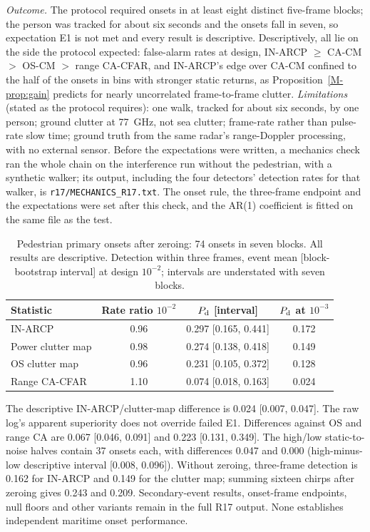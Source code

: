 \documentclass[10pt]{article}
\begin{document}
\emph{Outcome.} The protocol required onsets in at least eight distinct five-frame blocks; the person was tracked for about six seconds and the onsets fall in seven, so expectation E1 is not met and every result is descriptive. Descriptively, all lie on the side the protocol expected: false-alarm rates at design, IN-ARCP $\ge$ CA-CM $>$ OS-CM $>$ range CA-CFAR, and IN-ARCP's edge over CA-CM confined to the half of the onsets in bins with stronger static returns, as Proposition~\ref{M-prop:gain} predicts for nearly uncorrelated frame-to-frame clutter. \emph{Limitations} (stated as the protocol requires): one walk, tracked for about six seconds, by one person; ground clutter at 77~GHz, not sea clutter; frame-rate rather than pulse-rate slow time; ground truth from the same radar's range-Doppler processing, with no external sensor. Before the expectations were written, a mechanics check ran the whole chain on the interference run without the pedestrian, with a synthetic walker; its output, including the four detectors' detection rates for that walker, is \texttt{r17/MECHANICS\_R17.txt}. The onset rule, the three-frame endpoint and the expectations were set after this check, and the AR(1) coefficient is fitted on the same file as the test.



\begin{table}[htbp]
\centering\small\setlength{\tabcolsep}{4pt}
\caption{Pedestrian primary onsets after zeroing: 74 onsets in seven blocks. All results are descriptive. Detection within three frames, event mean [block-bootstrap interval] at design $10^{-2}$; intervals are understated with seven blocks.}\label{tab:pedestrian}
\begin{tabular}{lccc}
\toprule
Statistic & Rate ratio $10^{-2}$ & $P_{\rm d}$ [interval] & $P_{\rm d}$ at $10^{-3}$ \\
\midrule
IN-ARCP & 0.96 & 0.297 [0.165, 0.441] & 0.172 \\
Power clutter map & 0.98 & 0.274 [0.138, 0.418] & 0.149 \\
OS clutter map & 0.96 & 0.231 [0.105, 0.372] & 0.128 \\
Range CA-CFAR & 1.10 & 0.074 [0.018, 0.163] & 0.024 \\
\bottomrule
\end{tabular}
\end{table}

The descriptive IN-ARCP/clutter-map difference is 0.024 [0.007, 0.047]. The raw log's apparent superiority does not override failed E1. Differences against OS and range CA are 0.067 [0.046, 0.091] and 0.223 [0.131, 0.349]. The high/low static-to-noise halves contain 37 onsets each, with differences 0.047 and 0.000 (high-minus-low descriptive interval [0.008, 0.096]). Without zeroing, three-frame detection is 0.162 for IN-ARCP and 0.149 for the clutter map; summing sixteen chirps after zeroing gives 0.243 and 0.209. Secondary-event results, onset-frame endpoints, null floors and other variants remain in the full R17 output. None establishes independent maritime onset performance.
\end{document}
